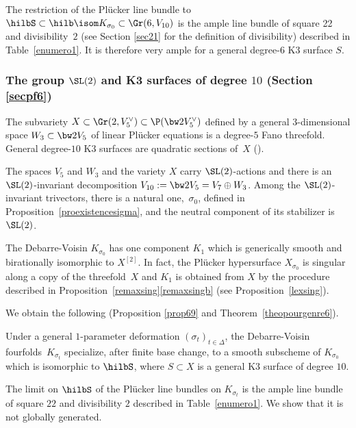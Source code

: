 The restriction of the Plücker line bundle to $\hilbS\subset \hilb\isom K_{\sigma_0}\subset \Gr (6, V_{10} ) $ is the
ample line bundle of square 22 and divisibility~$2$ (see Section
\ref{sec21} for the definition of divisibility) described in Table~\ref{enumero1}.
It is therefore very ample for a general degree-$6$ K3 surface $S$.

\subsubsection{The group $\SL(2)$ and K3 surfaces of degree $10$ (Section \ref{secpf6})}

The subvariety $X\subset \Gr(2,V_5^\vee)\subset \P(\bw2V_5^\vee)$ defined by a general $3$-dimensional
space $W_3\subset \bw2V_5$ of linear Plücker equations is a degree-$5$ Fano threefold. General degree-$10$ K3 surfaces are quadratic sections of~$X$
(\cite{mukai}).

The spaces $V_5$ and $W_3$ and the variety $X$ carry $\SL(2)$-actions and there is an $\SL(2)$-invariant decomposition $V_{10}:=\bw2V_5= V_7 \oplus W_3$.
Among the $\SL(2)$-invariant trivectors, there
is a natural one,~$\sigma_0$, defined in Proposition~\ref{proexistencesigma}, and the neutral component of its stabilizer is $\SL(2) $.

The Debarre-Voisin $K_{\sigma_0}$ has one component $K_1$ which is generically smooth and birationally isomorphic to $X^{[2]}$. In fact, the Plücker hypersurface $X_{\sigma_0}$ is singular along a copy of the threefold~$X$ and $K_1$ is obtained from $X$ by the procedure described in Proposition~\ref{remaxsing}\eqref{remaxsingb} (see Proposition~\ref{lexsing}).

We obtain the following (Proposition \ref{prop69} and Theorem~\ref{theopourgenre6}).

\begin{theo} \label{theohasgenus6}
Under a general $1$-parameter deformation
$(\sigma_t)_{t\in \Delta}$, the Debarre-Voisin fourfolds~$K_{\sigma_t}$ specialize, after finite base change, to a smooth subscheme of $K_{\sigma_0}$ which is isomorphic
to $\hilbS$,
where $S\subset X$ is a general K3 surface of degree $10$.
\end{theo}

The limit on $\hilbS$ of the Plücker line bundles on $K_{\sigma_t}$ is the
ample line bundle of square $22$ and divisibility $2$
described in Table~\ref{enumero1}.
We show that it is not globally generated.

\label{se114}

